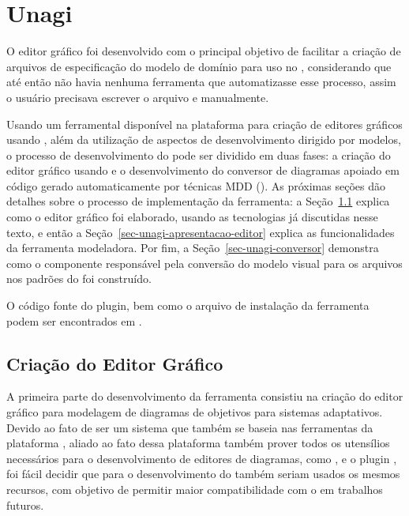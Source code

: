 \chapter{Unagi}
\label{sec-unagi}

O editor gráfico \unagi foi desenvolvido com o principal objetivo de facilitar a criação de arquivos de especificação do modelo de domínio para uso no \zanshin, considerando que até então não havia nenhuma ferramenta que automatizasse esse processo, assim o usuário precisava escrever o arquivo \xml e \ecore manualmente. 

Usando um ferramental disponível na plataforma \eclipse para criação de editores gráficos usando \emf, além da utilização de aspectos de desenvolvimento dirigido por modelos, o processo de desenvolvimento do \unagi pode ser dividido em duas fases: a criação do editor gráfico usando \sirius e o desenvolvimento do conversor de diagramas apoiado em código gerado automaticamente por técnicas MDD (\mdd). As próximas seções dão detalhes sobre o processo de implementação da ferramenta: a Seção~\ref{sec-unagi-criacao-editor} explica como o editor gráfico foi elaborado, usando as tecnologias já discutidas nesse texto, e então a Seção~\ref{sec-unagi-apresentacao-editor} explica as funcionalidades da ferramenta modeladora. Por fim, a Seção~\ref{sec-unagi-conversor} demonstra como o componente responsável pela conversão do modelo visual para os arquivos nos padrões do \zanshin foi construído.

O código fonte do plugin, bem como o arquivo de instalação da ferramenta podem ser encontrados em \codigoUnagi.

\section{Criação do Editor Gráfico}
\label{sec-unagi-criacao-editor}

A primeira parte do desenvolvimento da ferramenta consistiu  na criação do editor gráfico para modelagem de diagramas de objetivos para sistemas adaptativos. Devido ao fato de \zanshin ser um sistema que também se baseia nas ferramentas da plataforma \eclipse, aliado ao fato dessa plataforma também prover todos os utensílios necessários para o desenvolvimento de editores de diagramas, como \ecore, \emf e o plugin \sirius, foi fácil decidir que para o desenvolvimento do \unagi também seriam usados os mesmos recursos, com objetivo de permitir maior compatibilidade com o \zanshin em trabalhos futuros.

